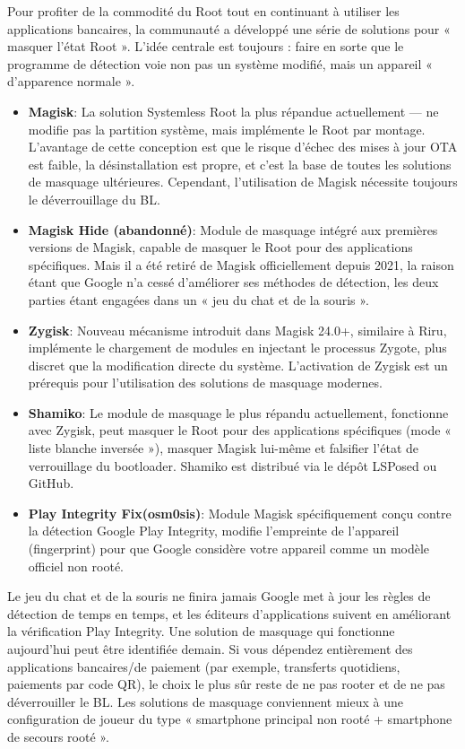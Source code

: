 Pour profiter de la commodité du Root tout en continuant à utiliser les applications bancaires, la communauté a développé une série de solutions pour « masquer l'état Root ». L'idée centrale est toujours : faire en sorte que le programme de détection voie non pas un système modifié, mais un appareil « d'apparence normale ».

\begin{itemize}
  \item \textbf{Magisk}: La solution Systemless Root la plus répandue actuellement — ne modifie pas la partition système, mais implémente le Root par montage. L'avantage de cette conception est que le risque d'échec des mises à jour OTA est faible, la désinstallation est propre, et c'est la base de toutes les solutions de masquage ultérieures. Cependant, l'utilisation de Magisk nécessite toujours le déverrouillage du BL.
  \item \textbf{Magisk Hide (abandonné)}: Module de masquage intégré aux premières versions de Magisk, capable de masquer le Root pour des applications spécifiques. Mais il a été retiré de Magisk officiellement depuis 2021, la raison étant que Google n'a cessé d'améliorer ses méthodes de détection, les deux parties étant engagées dans un « jeu du chat et de la souris ».
  \item \textbf{Zygisk}: Nouveau mécanisme introduit dans Magisk 24.0+, similaire à Riru, implémente le chargement de modules en injectant le processus Zygote, plus discret que la modification directe du système. L'activation de Zygisk est un prérequis pour l'utilisation des solutions de masquage modernes.
  \item \textbf{Shamiko}: Le module de masquage le plus répandu actuellement, fonctionne avec Zygisk, peut masquer le Root pour des applications spécifiques (mode « liste blanche inversée »), masquer Magisk lui-même et falsifier l'état de verrouillage du bootloader. Shamiko est distribué via le dépôt LSPosed ou GitHub.
  \item \textbf{Play Integrity Fix(osm0sis)}: Module Magisk spécifiquement conçu contre la détection Google Play Integrity, modifie l'empreinte de l'appareil (fingerprint) pour que Google considère votre appareil comme un modèle officiel non rooté.
\end{itemize}

\begin{tcbwarn}{Le jeu du chat et de la souris ne finira jamais}
Google met à jour les règles de détection de temps en temps, et les éditeurs d'applications suivent en améliorant la vérification Play Integrity. Une solution de masquage qui fonctionne aujourd'hui peut être identifiée demain. Si vous dépendez entièrement des applications bancaires/de paiement (par exemple, transferts quotidiens, paiements par code QR), le choix le plus sûr reste de ne pas rooter et de ne pas déverrouiller le BL. Les solutions de masquage conviennent mieux à une configuration de joueur du type « smartphone principal non rooté + smartphone de secours rooté ».

\end{tcbwarn}


